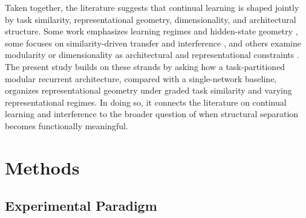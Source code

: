 \documentclass[letterpaper]{article}
\begin{document}
Taken together, the literature suggests that continual learning is shaped jointly by task similarity, representational geometry, dimensionality, and architectural structure. Some work emphasizes learning regimes and hidden-state geometry \cite{flesch2022representation}, some focuses on similarity-driven transfer and interference \cite{holton2025humans,menghi2025impact}, and others examine modularity or dimensionality as architectural and representational constraints \cite{yu2025dimensionality,Johnston2024.09.30.615925,bena2025dynamics,lu2025rethinking}. The present study builds on these strands by asking how a task-partitioned modular recurrent architecture, compared with a single-network baseline, organizes representational geometry under graded task similarity and varying representational regimes. In doing so, it connects the literature on continual learning and interference to the broader question of when structural separation becomes functionally meaningful.
     

\section{Methods}
        \subsection{Experimental Paradigm}
        
\end{document}
